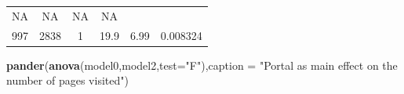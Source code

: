 \documentclass[]{article}
\newenvironment{Shaded}{\begin{snugshade}}{\end{snugshade}}
\newcommand{\KeywordTok}[1]{\textcolor[rgb]{0.13,0.29,0.53}{\textbf{#1}}}
\newcommand{\DataTypeTok}[1]{\textcolor[rgb]{0.13,0.29,0.53}{#1}}
\newcommand{\StringTok}[1]{\textcolor[rgb]{0.31,0.60,0.02}{#1}}
\newcommand{\NormalTok}[1]{#1}
\begin{document}
\begin{longtable}[]{@{}cccccc@{}}
\begin{minipage}[t]{0.06\columnwidth}
NA\strut
\end{minipage} & \begin{minipage}[t]{0.14\columnwidth}\centering\strut
NA\strut
\end{minipage} & \begin{minipage}[t]{0.08\columnwidth}\centering\strut
NA\strut
\end{minipage} & \begin{minipage}[t]{0.12\columnwidth}\centering\strut
NA\strut
\end{minipage}\tabularnewline
\begin{minipage}[t]{0.10\columnwidth}\centering\strut
997\strut
\end{minipage} & \begin{minipage}[t]{0.08\columnwidth}\centering\strut
2838\strut
\end{minipage} & \begin{minipage}[t]{0.06\columnwidth}\centering\strut
1\strut
\end{minipage} & \begin{minipage}[t]{0.14\columnwidth}\centering\strut
19.9\strut
\end{minipage} & \begin{minipage}[t]{0.08\columnwidth}\centering\strut
6.99\strut
\end{minipage} & \begin{minipage}[t]{0.12\columnwidth}\centering\strut
0.008324\strut
\end{minipage}\tabularnewline
\bottomrule
\end{longtable}

\begin{Shaded}
\begin{Highlighting}[]
\KeywordTok{pander}\NormalTok{(}\KeywordTok{anova}\NormalTok{(model0,model2,}\DataTypeTok{test=}\StringTok{"F"}\NormalTok{),}\DataTypeTok{caption =} \StringTok{"Portal as main effect on the number of pages visited"}\NormalTok{)}
\end{Highlighting}
\end{Shaded}
\end{document}
